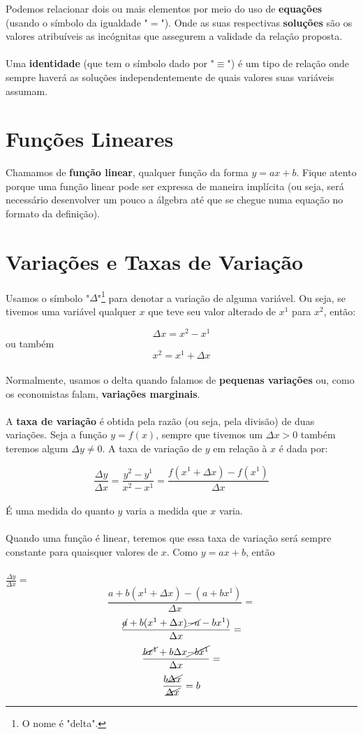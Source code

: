 \documentclass[a4paper,11pt,oneside]{book}
\theoremstyle{definition}
\theoremstyle{break}
\begin{document}
Podemos relacionar dois ou mais elementos por meio do uso de \textbf{equações} (usando o símbolo da igualdade "$=$"). Onde as suas respectivas \textbf{soluções} são os valores atribuíveis as incógnitas que assegurem a validade da relação proposta.
\\
\\
Uma \textbf{identidade} (que tem o símbolo dado por "$\equiv$") é um tipo de relação onde sempre haverá as soluções independentemente de quais valores suas variáveis assumam.

\section*{Funções Lineares}

Chamamos de \textbf{função linear}, qualquer função da forma $y = ax + b$. Fique atento porque uma função linear pode ser expressa de maneira implícita (ou seja, será necessário desenvolver um pouco a álgebra até que se chegue numa equação no formato da definição).

\section*{Variações e Taxas de Variação}

Usamos o símbolo "$\Delta$"\footnote{O nome é "delta".} para denotar a variação de alguma variável. Ou seja, se tivemos uma variável qualquer $x$ que teve seu valor alterado de $x^1$ para $x^2$, então:

$$ \Delta x = x^2 - x^1 $$
ou também
$$ x^2 = x^1 + \Delta x $$
\\
Normalmente, usamos o delta quando falamos de \textbf{pequenas variações} ou, como os economistas falam, \textbf{variações marginais}.
\\
\\
A \textbf{taxa de variação} é obtida pela razão (ou seja, pela divisão) de duas variações. Seja a função $y = f(x)$, sempre que tivemos um $\Delta x > 0$ também teremos algum $\Delta y \neq 0$. A taxa de variação de $y$ em relação à $x$ é dada por:

$$ \frac{\Delta y}{\Delta x} = \frac{y^2 - y^1}{x^2 - x^1} = \frac{f(x^1 + \Delta x) - f(x^1)}{\Delta x} $$
\\
É uma medida do quanto $y$ varia a medida que $x$ varia.
\\
\\
Quando uma função é linear, teremos que essa taxa de variação será sempre constante para quaisquer valores de $x$. Como $y = ax + b$, então
\\
\\
\Large $ \frac{\Delta y}{\Delta x} = $ \normalsize
$$ \frac{a+b(x^1 + \Delta x) - (a + bx^1)}{\Delta x} = $$
$$ \frac{\cancel{a}+b(x^1 + \Delta x) \cancel{-a} - bx^1)}{\Delta x} = $$
$$ \frac{\cancel{bx^1} + b \Delta x \cancel{- bx^1}}{\Delta x} = $$
$$ \frac{b \cancel{\Delta x}}{\cancel{\Delta x}} = b  $$
\end{document}
